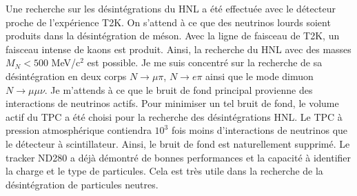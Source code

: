 \documentclass[../main.tex]{subfiles}
\begin{document}

Une recherche sur les désintégrations du HNL a été effectuée avec le détecteur proche de l'expérience T2K. On s'attend à ce que des neutrinos lourds soient produits dans la désintégration de méson. Avec la ligne de faisceau de T2K, un faisceau intense de kaons est produit. Ainsi, la recherche du HNL avec des masses $M_N < 500$ MeV/c${}^2$ est possible. Je me suis concentré sur la recherche de sa désintégration en deux corps $N\to\mu\pi$, $N\to e\pi$ ainsi que le mode dimuon $N\to\mu\mu\nu$. Je m'attends à ce que le bruit de fond principal provienne des interactions de neutrinos actifs. Pour minimiser un tel bruit de fond, le volume actif du TPC a été choisi pour la recherche des désintégrations HNL. Le TPC à pression atmosphérique contiendra $10^3$ fois moins d'interactions de neutrinos que le détecteur à scintillateur. Ainsi, le bruit de fond est naturellement supprimé. Le tracker ND280 a déjà démontré de bonnes performances et la capacité à identifier la charge et le type de particules. Cela est très utile dans la recherche de la désintégration de particules neutres.

\end{document}
